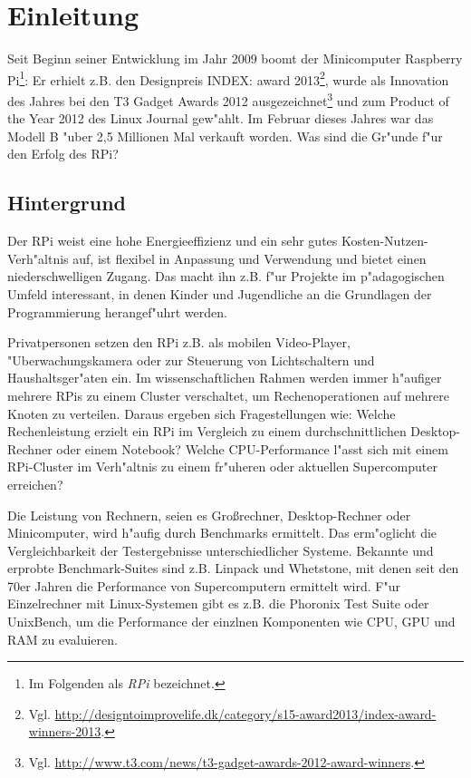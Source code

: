 \chapter{Einleitung}\label{Kapitel 1}


Seit Beginn seiner Entwicklung im Jahr 2009 boomt der Minicomputer Raspberry Pi\footnote{Im Folgenden als \textit{RPi} bezeichnet.}: Er erhielt z.B. den Designpreis INDEX: award 2013\footnote{Vgl. \url{http://designtoimprovelife.dk/category/s15-award2013/index-award-winners-2013}.}, wurde als Innovation des Jahres bei den T3 Gadget Awards 2012 ausgezeichnet\footnote{Vgl. \url{http://www.t3.com/news/t3-gadget-awards-2012-award-winners}.}
und zum Product of the Year 2012 des Linux Journal gew"ahlt. 
Im Februar dieses Jahres war das Modell B "uber 2,5 Millionen Mal verkauft worden. Was sind die Gr"unde f"ur den Erfolg des RPi? 

\section{Hintergrund}\label{Hintergrund}

Der RPi weist eine hohe Energieeffizienz und ein sehr gutes Kosten-Nutzen-Verh"altnis auf, ist flexibel in Anpassung und Verwendung und bietet einen niederschwelligen Zugang. Das macht ihn z.B. f"ur Projekte im p"adagogischen Umfeld interessant, in denen Kinder und Jugendliche an die Grundlagen der Programmierung herangef"uhrt werden. 

Privatpersonen setzen den RPi z.B. als mobilen Video-Player, "Uberwachungskamera oder zur Steuerung von Lichtschaltern und Haushaltsger"aten ein. Im wissenschaftlichen Rahmen werden immer h"aufiger mehrere RPis zu einem Cluster verschaltet, um Rechenoperationen auf mehrere Knoten zu verteilen. Daraus ergeben sich Fragestellungen wie: Welche Rechenleistung erzielt ein RPi im Vergleich zu einem durchschnittlichen Desktop-Rechner oder einem Notebook? Welche CPU-Performance l"asst sich mit einem RPi-Cluster im Verh"altnis zu einem fr"uheren oder aktuellen Supercomputer erreichen? 

Die Leistung von Rechnern, seien es Gro\ss rechner, Desktop-Rechner oder Minicomputer, wird h"aufig durch Benchmarks ermittelt. Das erm"oglicht die Vergleichbarkeit der Testergebnisse unterschiedlicher Systeme. Bekannte und erprobte Benchmark-Suites sind z.B. Linpack und Whetstone, mit denen seit den 70er Jahren die Performance von Supercomputern ermittelt wird. F"ur Einzelrechner mit Linux-Systemen gibt es z.B. die Phoronix Test Suite oder UnixBench, um die Performance der einzlnen Komponenten wie CPU, GPU und RAM zu evaluieren. 

